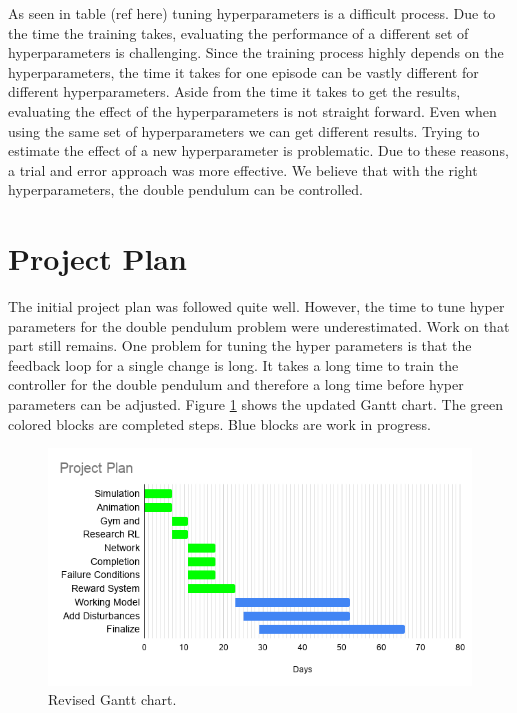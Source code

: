\documentclass{LTHtwocol} %
\begin{document}
As seen in table (ref here) tuning hyperparameters is a difficult process. 
Due to the time the training takes, evaluating the performance of a different set of hyperparameters is challenging.
Since the training process highly depends on the hyperparameters, the time it takes for one episode can be vastly different for different hyperparameters.
Aside from the time it takes to get the results, evaluating the effect of the hyperparameters is not straight forward.
Even when using the same set of hyperparameters we can get different results.
Trying to estimate the effect of a new hyperparameter is problematic.
Due to these reasons, a trial and error approach was more effective.
We believe that with the right hyperparameters, the double pendulum can be controlled.

\section{Project Plan}
The initial project plan was followed quite well.
However, the time to tune hyper parameters for the double pendulum problem were underestimated.
Work on that part still remains.
One problem for tuning the hyper parameters is that the feedback loop for a single change is long.
It takes a long time to train the controller for the double pendulum and therefore a long time before hyper parameters can be adjusted.
Figure \ref{fig:gantt_chart} shows the updated Gantt chart.
The green colored blocks are completed steps.
Blue blocks are work in progress.
\begin{figure}[H]
   \centering
   \includegraphics[width=0.9\columnwidth]{figures/Revised_Project_plan.png}
   \caption{Revised Gantt chart.}
   \label{fig:gantt_chart}
\end{figure}
\printbibliography
\end{document}
